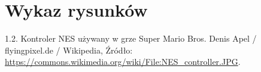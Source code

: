 \chapter{Wykaz rysunków}

1.2. Kontroler NES używany w grze Super Mario Bros. Denis Apel / flyingpixel.de / Wikipedia, Źródło: \url{https://commons.wikimedia.org/wiki/File:NES_controller.JPG}.
